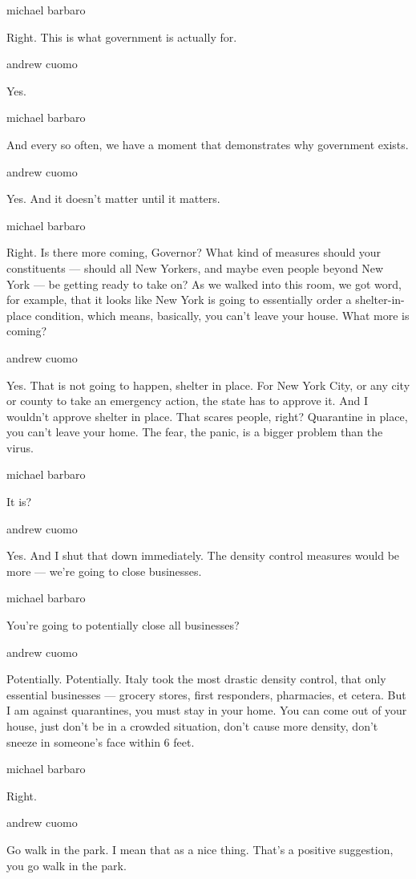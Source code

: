 michael barbaro

Right. This is what government is actually for.

andrew cuomo

Yes.

michael barbaro

And every so often, we have a moment that demonstrates why government
exists.

andrew cuomo

Yes. And it doesn't matter until it matters.

michael barbaro

Right. Is there more coming, Governor? What kind of measures should your
constituents --- should all New Yorkers, and maybe even people beyond
New York --- be getting ready to take on? As we walked into this room,
we got word, for example, that it looks like New York is going to
essentially order a shelter-in-place condition, which means, basically,
you can't leave your house. What more is coming?

andrew cuomo

Yes. That is not going to happen, shelter in place. For New York City,
or any city or county to take an emergency action, the state has to
approve it. And I wouldn't approve shelter in place. That scares people,
right? Quarantine in place, you can't leave your home. The fear, the
panic, is a bigger problem than the virus.

michael barbaro

It is?

andrew cuomo

Yes. And I shut that down immediately. The density control measures
would be more --- we're going to close businesses.

michael barbaro

You're going to potentially close all businesses?

andrew cuomo

Potentially. Potentially. Italy took the most drastic density control,
that only essential businesses --- grocery stores, first responders,
pharmacies, et cetera. But I am against quarantines, you must stay in
your home. You can come out of your house, just don't be in a crowded
situation, don't cause more density, don't sneeze in someone's face
within 6 feet.

michael barbaro

Right.

andrew cuomo

Go walk in the park. I mean that as a nice thing. That's a positive
suggestion, you go walk in the park.

